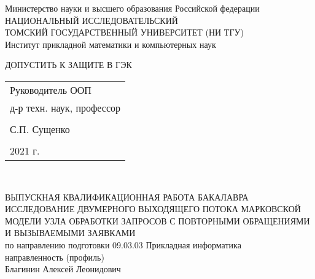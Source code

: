 	\begin{center}\linespread{1}
		\normalsize{Министерство науки и высшего образования Российской федерации}\\
		\normalsize{НАЦИОНАЛЬНЫЙ ИССЛЕДОВАТЕЛЬСКИЙ}\\ 
		\normalsize{ТОМСКИЙ ГОСУДАРСТВЕННЫЙ УНИВЕРСИТЕТ (НИ ТГУ)}\\
		\normalsize{Институт прикладной математики и компьютерных наук}\\
		\hfill\break
		
	\end{center}
\begin{flushright}\linespread{0.9}
	\normalsize{ДОПУСТИТЬ К ЗАЩИТЕ В ГЭК}\\ 
	\normalsize{ 
		\begin{tabular}{@{}l@{}}
			Руководитель ООП\\  д-р техн. наук,  профессор\\\\ \underline{\hspace{3.5cm}} С.П. Сущенко\\\\
			\textquote{\underline{\hspace{1cm}}}\underline{\hspace{4cm}}2021 г.	
		\end{tabular}	
	}\\
\end{flushright}
\hfill \break
\hfill \break
\begin{center}\linespread{1}
		\large{ВЫПУСКНАЯ КВАЛИФИКАЦИОННАЯ РАБОТА БАКАЛАВРА}\\
		\hfill \break
		\large{ИССЛЕДОВАНИЕ ДВУМЕРНОГО ВЫХОДЯЩЕГО ПОТОКА МАРКОВСКОЙ МОДЕЛИ УЗЛА ОБРАБОТКИ ЗАПРОСОВ С ПОВТОРНЫМИ ОБРАЩЕНИЯМИ И ВЫЗЫВАЕМЫМИ ЗАЯВКАМИ}\\
		\hfill \break
		\normalsize{по направлению подготовки 09.03.03 Прикладная информатика\\
		направленность (профиль)  \\
		\hfill \break
	Благинин Алексей Леонидович}\\
		\hfill \break
		\hfill \break
	\end{center}
